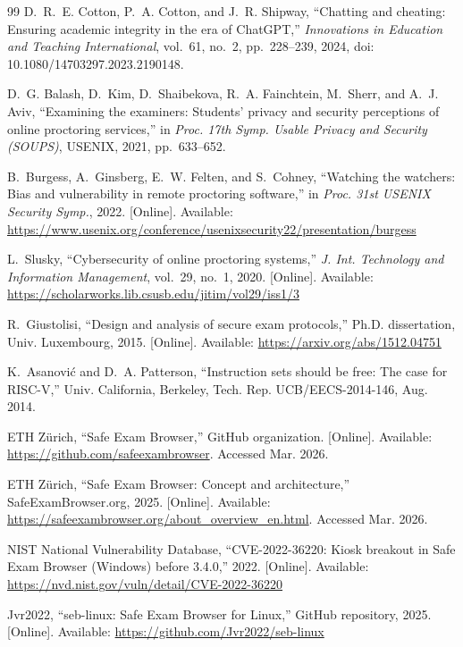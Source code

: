 \documentclass[11pt]{article}
\begin{document}
\newpage
\begin{thebibliography}{99}
\small
{}
D.~R.~E. Cotton, P.~A. Cotton, and J.~R. Shipway, ``Chatting and cheating: Ensuring academic integrity in the era of ChatGPT,'' \emph{Innovations in Education and Teaching International}, vol.~61, no.~2, pp.~228--239, 2024, doi: 10.1080/14703297.2023.2190148.

D.~G. Balash, D.~Kim, D.~Shaibekova, R.~A. Fainchtein, M.~Sherr, and A.~J. Aviv, ``Examining the examiners: Students' privacy and security perceptions of online proctoring services,'' in \emph{Proc. 17th Symp. Usable Privacy and Security (SOUPS)}, USENIX, 2021, pp.~633--652.

B.~Burgess, A.~Ginsberg, E.~W. Felten, and S.~Cohney, ``Watching the watchers: Bias and vulnerability in remote proctoring software,'' in \emph{Proc. 31st USENIX Security Symp.}, 2022. [Online]. Available: \url{https://www.usenix.org/conference/usenixsecurity22/presentation/burgess}

L.~Slusky, ``Cybersecurity of online proctoring systems,'' \emph{J. Int. Technology and Information Management}, vol.~29, no.~1, 2020. [Online]. Available: \url{https://scholarworks.lib.csusb.edu/jitim/vol29/iss1/3}

R.~Giustolisi, ``Design and analysis of secure exam protocols,'' Ph.D. dissertation, Univ. Luxembourg, 2015. [Online]. Available: \url{https://arxiv.org/abs/1512.04751}

K.~Asanovi\'c and D.~A. Patterson, ``Instruction sets should be free: The case for RISC-V,'' Univ. California, Berkeley, Tech. Rep. UCB/EECS-2014-146, Aug. 2014.

ETH Z\"urich, ``Safe Exam Browser,'' GitHub organization. [Online]. Available: \url{https://github.com/safeexambrowser}. Accessed Mar. 2026.

ETH Z\"urich, ``Safe Exam Browser: Concept and architecture,'' SafeExamBrowser.org, 2025. [Online]. Available: \url{https://safeexambrowser.org/about_overview_en.html}. Accessed Mar. 2026.

NIST National Vulnerability Database, ``CVE-2022-36220: Kiosk breakout in Safe Exam Browser (Windows) before 3.4.0,'' 2022. [Online]. Available: \url{https://nvd.nist.gov/vuln/detail/CVE-2022-36220}

Jvr2022, ``seb-linux: Safe Exam Browser for Linux,'' GitHub repository, 2025. [Online]. Available: \url{https://github.com/Jvr2022/seb-linux}


\end{thebibliography}
\end{document}
